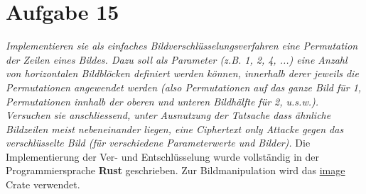 \section{Aufgabe 15}
\textit{Implementieren sie als einfaches Bildverschlüsselungsverfahren eine Permutation der
Zeilen eines Bildes. Dazu soll als Parameter (z.B. 1, 2, 4, ...) eine Anzahl von
horizontalen Bildblöcken definiert werden können, innerhalb derer jeweils die Permutationen angewendet werden (also Permutationen auf das ganze Bild für 1, Permutationen innhalb der oberen und unteren Bildhälfte für 2, u.s.w.). Versuchen
sie anschliessend, unter Ausnutzung der Tatsache dass ähnliche Bildzeilen meist
nebeneinander liegen, eine Ciphertext only Attacke gegen das verschlüsselte Bild
(für verschiedene Parameterwerte und Bilder).}\vspace*{1em}\newline
Die Implementierung der Ver- und Entschlüsselung wurde vollständig in der Programmiersprache
\textbf{Rust} geschrieben. Zur Bildmanipulation wird das \href{https://docs.rs/image/latest/image/}{image} Crate verwendet. 

